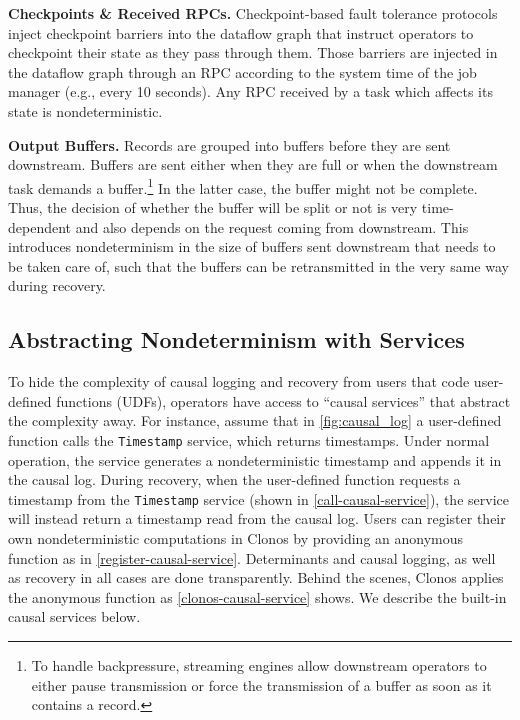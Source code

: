 \documentclass[sigconf]{acmart}
\newcommand{\para}[1]{\vspace{1mm}\noindent\textbf{#1.}}
\begin{document}
\para{Checkpoints \& Received RPCs} Checkpoint-based fault tolerance protocols inject checkpoint barriers into the dataflow graph that instruct operators to checkpoint their state as they pass through them.
Those barriers are injected in the dataflow graph through an RPC according to the system time of the job manager (e.g., every 10 seconds). Any RPC received by a task which affects its state is nondeterministic.

\para{Output Buffers} Records are grouped into buffers before they are sent downstream. Buffers are sent either when they are full or when the downstream task demands a buffer.\footnote{To handle backpressure, streaming engines allow  downstream operators to either pause transmission or force the transmission of a buffer as soon as it contains a record.} In the latter case, the buffer might not be complete. Thus, the decision of whether the buffer will be split or not is very time-dependent and also depends on the request coming from downstream. This introduces nondeterminism in the size of buffers sent downstream that needs to be taken care of, such that the buffers can be retransmitted in the very same way during recovery.





\subsection{Abstracting Nondeterminism with Services}
\label{sec:determinants}

To hide the complexity of causal logging and recovery from users that code user-defined functions (UDFs), operators have access to ``causal services'' that abstract the complexity away. For instance, assume that in \autoref{fig:causal_log} a user-defined function calls the \texttt{Timestamp} service, which returns timestamps. 
Under normal operation, the service generates a nondeterministic timestamp and appends it in the causal log.
During recovery, when the user-defined function requests a timestamp from the \texttt{Timestamp} service (shown in \autoref{call-causal-service}), the service will instead return a timestamp read from the causal log. Users can register their own nondeterministic computations in Clonos by providing an anonymous function as in \autoref{register-causal-service}. Determinants and causal logging, as well as recovery in all cases are done transparently. Behind the scenes, Clonos applies the anonymous function as \autoref{clonos-causal-service} shows. We describe the built-in causal services below.
\end{document}
